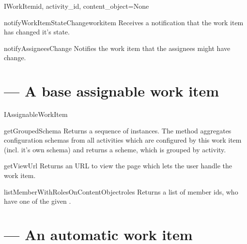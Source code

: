 \begin{classdesc}{IWorkItem}{id, activity_id, content_object=None}
      \begin{funcdesc}{notifyWorkItemStateChange}{workitem}
          Receives a notification that the work item  has 
          changed it's state.
      \end{funcdesc}

      \begin{funcdesc}{notifyAssigneesChange}{}
          Notifies the work item that the assignees might have change.
      \end{funcdesc}

    \end{classdesc}
  
  \section{ --- A base assignable work item}
    

    \begin{classdesc}{IAssignableWorkItem}{}

        \begin{funcdesc}{getGroupedSchema}{}
            Returns a sequence of  instances. The 
            method aggregates configuration schemas from all activities 
            which are configured by this work item (incl. it's own 
            schema) and returns a scheme, which is grouped by activity.
        \end{funcdesc}

        \begin{funcdesc}{getViewUrl}{}
            Returns an URL to view the page which lets the user handle 
            the work item.
        \end{funcdesc}

        \begin{funcdesc}{listMemberWithRolesOnContentObject}{roles}
            Returns a list of member ids, who have one of the given .
        \end{funcdesc}

    \end{classdesc}

  \section{ --- An automatic work item}
    
